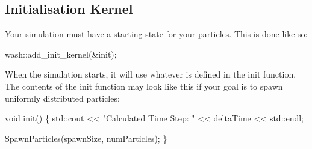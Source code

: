 \subsection*{Initialisation Kernel}

Your simulation must have a starting state for your particles. This is done like so\+: 
\begin{DoxyCode}
wash::add\_init\_kernel(&init);
\end{DoxyCode}
 When the simulation starts, it will use whatever is defined in the {\ttfamily init} function. The contents of the {\ttfamily init} function may look like this if your goal is to spawn uniformly distributed particles\+: 
\begin{DoxyCode}
\textcolor{keywordtype}{void} init() \{
    std::cout << \textcolor{stringliteral}{"Calculated Time Step: "} << deltaTime << std::endl;

    SpawnParticles(spawnSize, numParticles);
\}
\end{DoxyCode}



